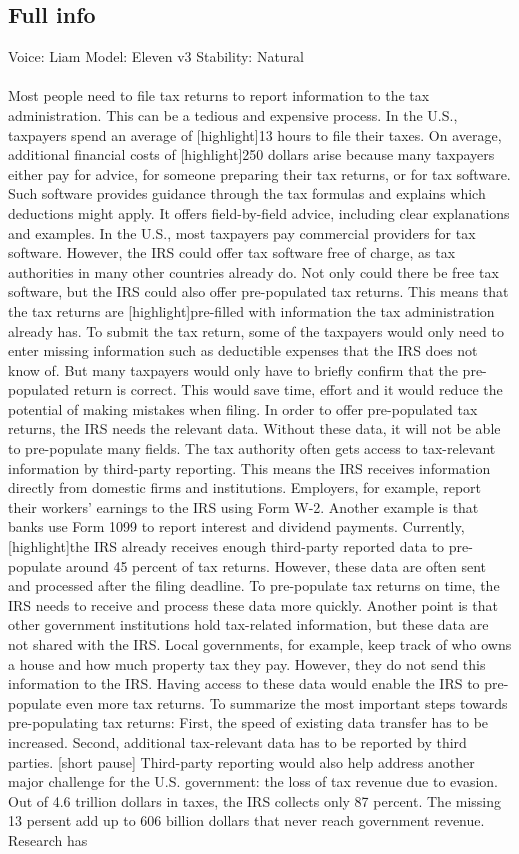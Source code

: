 \documentclass[11pt]{article}
\begin{document}
\subsection{Full info}
Voice: Liam
Model: Eleven v3
Stability: Natural\\\\
Most people need to file tax returns to report information to the tax administration. This can be a tedious and expensive process. In the U.S., taxpayers spend an average of [highlight]13 hours to file their taxes. On average, additional financial costs of [highlight]250 dollars arise because many taxpayers either pay for advice, for someone preparing their tax returns, or for tax software. Such software provides guidance through the tax formulas and explains which deductions might apply. It offers field-by-field advice, including clear explanations and examples. In the U.S., most taxpayers pay commercial providers for tax software. However, the IRS could offer tax software free of charge, as tax authorities in many other countries already do. Not only could there be free tax software, but the IRS could also offer pre-populated tax returns. This means that the tax returns are [highlight]pre-filled with information the tax administration already has. To submit the tax return, some of the taxpayers would only need to enter missing information such as deductible expenses that the IRS does not know of. But many taxpayers would only have to briefly confirm that the pre-populated return is correct. This would save time, effort and it would reduce the potential of making mistakes when filing. In order to offer pre-populated tax returns, the IRS needs the relevant data. Without these data, it will not be able to pre-populate many fields. The tax authority often gets access to tax-relevant information by third-party reporting. This means the IRS receives information directly from domestic firms and institutions. Employers, for example, report their workers’ earnings to the IRS using Form W-2. Another example is that banks use Form 1099 to report interest and dividend payments. Currently, [highlight]the IRS already receives enough third-party reported data to pre-populate around 45 percent of tax returns. However, these data are often sent and processed after the filing deadline. To pre-populate tax returns on time, the IRS needs to receive and process these data more quickly. Another point is that other government institutions hold tax-related information, but these data are not shared with the IRS. Local governments, for example, keep track of who owns a house and how much property tax they pay. However, they do not send this information to the IRS. Having access to these data would enable the IRS to pre-populate even more tax returns. To summarize the most important steps towards pre-populating tax returns: First, the speed of existing data transfer has to be increased. Second, additional tax-relevant data has to be reported by third parties. [short pause] Third-party reporting would also help address another major challenge for the U.S. government: the loss of tax revenue due to evasion. Out of 4.6 trillion dollars in taxes, the IRS collects only 87 percent. The missing 13 persent add up to 606 billion dollars that never reach government revenue. Research has 
\end{document}
